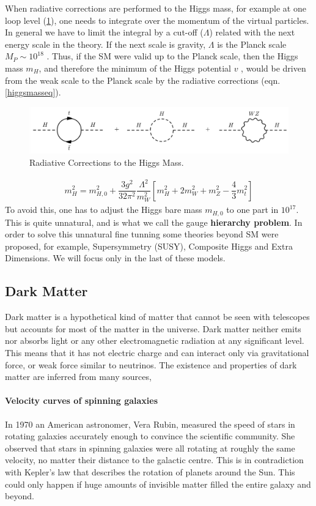When radiative corrections are performed to the Higgs mass, for example at one loop level (\cref{figurehiggsmass}), one needs to integrate over  the momentum of the virtual particles. In general we have to limit the integral by a cut-off ($\Lambda$) related with  the next energy scale in the theory.
If the next scale is gravity, $\Lambda$ is the Planck scale $M_{P} \sim 10^{18}$ \gev. Thus, if the SM were valid up to the Planck scale, then the Higgs mass $m_{H}$,	and therefore the minimum of the Higgs potential $v$ , would be driven from the weak scale to the Planck scale by the radiative corrections (eqn. \ref{higgsmasseq}).
\begin{figure}[H]
  \centering
\includegraphics[width=15cm]{SM_chapter_plots/higgsmass}
\caption{Radiative Corrections to the Higgs Mass. \label{figurehiggsmass}}
\end{figure}
\begin{eqnarray}\label{higgsmasseq}
m_{H}^{2} = m_{H,0}^{2} + \dfrac{3 g^{2}}{32 \pi^{2}}\dfrac{\Lambda^{2}}{m_{W}^{2}}\left[ m_{H}^{2} + 2m_{W}^{2} + m_{Z}^{2} - \dfrac{4}{3} m_{t}^{2}  \right] 
\end{eqnarray}
To avoid this, one
has to adjust the Higgs bare mass $m_{H,0}$ to one
part in $10^{17}$. This is quite unnatural, and is what we call the
gauge \textbf{hierarchy problem}.
In order to solve this unnatural fine tunning some theories beyond SM were proposed, for example, Supersymmetry (SUSY), Composite Higgs and Extra Dimensions. We will focus only in the last of these models.

\subsection{Dark Matter}

Dark matter is a hypothetical kind of matter that cannot be seen with telescopes but accounts for most of the matter in the universe. Dark matter neither emits nor absorbs light or any other electromagnetic radiation at any significant level. This means that it has not electric charge and can interact only via gravitational force, or weak force similar to neutrinos.
The existence and properties of dark matter are inferred from many sources,
\paragraph{Velocity curves of spinning galaxies} In 1970 an American astronomer, Vera Rubin, measured the speed of stars in rotating galaxies accurately enough to convince the scientific community. She observed that stars in spinning galaxies were all rotating at roughly the same velocity, no matter their distance to the galactic centre. This is in contradiction with Kepler’s law that describes the rotation of planets around the Sun.  This could only happen if huge amounts of invisible matter filled the entire galaxy and beyond.
